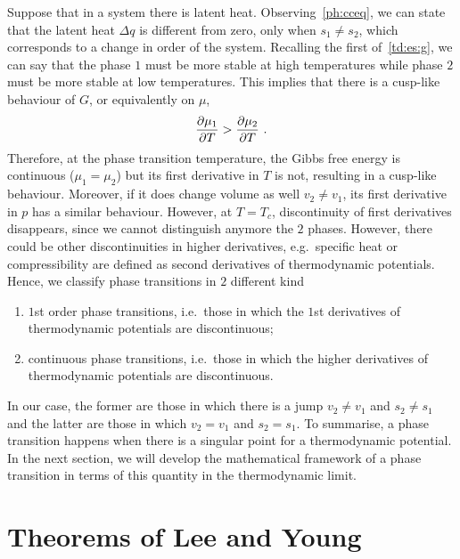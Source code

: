 
    Suppose that in a system there is latent heat. Observing~\eqref{ph:cceq}, we can state that the latent heat $\Delta q$ is different from zero, only when $s_1 \neq s_2$, which corresponds to a change in order of the system. Recalling the first of~\eqref{td:es:g}, we can say that the phase $1$ must be more stable at high temperatures while phase $2$ must be more stable at low temperatures. This implies that there is a cusp-like behaviour of $G$, or equivalently on $\mu$,
    \begin{equation*}
        \frac{\partial\mu_1}{\partial T} > \frac{\partial\mu_2}{\partial T} ~.
    \end{equation*}
    Therefore, at the phase transition temperature, the Gibbs free energy is continuous ($\mu_1 = \mu_2$) but its first derivative in $T$ is not, resulting in a cusp-like behaviour. Moreover, if it does change volume as well $v_2 \neq v_1$, its first derivative in $p$ has a similar behaviour. However, at $T = T_c$, discontinuity of first derivatives disappears, since we cannot distinguish anymore the $2$ phases. However, there could be other discontinuities in higher derivatives, e.g.~specific heat or compressibility are defined as second derivatives of thermodynamic potentials. Hence, we classify phase transitions in $2$ different kind 
    \begin{enumerate}
        \item $1$st order phase transitions, i.e.~those in which the $1$st derivatives of thermodynamic potentials are discontinuous;
        \item continuous phase transitions, i.e.~those in which the higher derivatives of thermodynamic potentials are discontinuous.
    \end{enumerate}
    In our case, the former are those in which there is a jump $v_2 \neq v_1$ and $s_2 \neq s_1$ and the latter are those in which $v_2 = v_1$ and $s_2 = s_1$. To summarise, a phase transition happens when there is a singular point for a thermodynamic potential.  
    In the next section, we will develop the mathematical framework of a phase transition in terms of this quantity in the thermodynamic limit.

\section{Theorems of Lee and Young}

